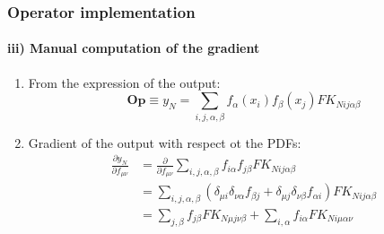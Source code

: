 \documentclass[aspectratio=43]{beamer}
\begin{document}
\begin{frame}
	
	\frametitle{Operator implementation}
	\framesubtitle{iii) Manual computation of the gradient}
	
	\begin{enumerate}
		\item From the expression of the output:
		\begin{equation}
			\textbf{Op} \equiv y_{N} = \sum_{i, j, \alpha, \beta} f_{\alpha}(x_{i}) f_{\beta}(x_{j}) FK_{N i j \alpha \beta} \nonumber
		\end{equation}
		\item Gradient of the output with respect ot the PDFs:
		\begin{align}
			\frac{\partial y_{N}}{\partial f_{\mu \nu}} &=
			\frac{\partial}{\partial f_{\mu \nu}} \sum_{i, j, \alpha, \beta} f_{i \alpha} f_{j \beta} FK_{N i j \alpha \beta} \nonumber \\
			&= \sum_{i, j, \alpha, \beta} (\delta_{\mu i} \delta_{\nu \alpha} f_{\beta j} + \delta_{\mu j} \delta_{\nu \beta} f_{\alpha i})
			FK_{N i j \alpha \beta} \\
			&= \sum_{j, \beta} f_{j \beta} FK_{N \mu j \nu \beta} + \sum_{i, \alpha} f_{i \alpha} FK_{N i \mu \alpha \nu} \nonumber
		\end{align}

	\end{enumerate}

\end{frame}
\end{document}
